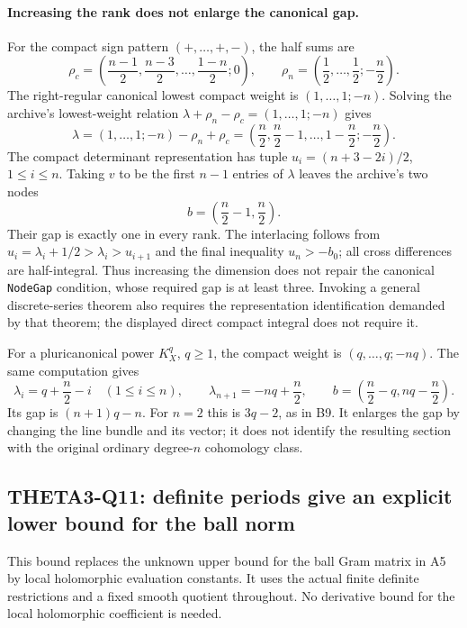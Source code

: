 \documentclass[11pt]{article}
\theoremstyle{definition}\newtheorem{definition}[theorem]{Definition}\newtheorem{remark}[theorem]{Remark}
\begin{document}
\paragraph{Increasing the rank does not enlarge the canonical gap.}
For the compact sign pattern $(+,\ldots,+,-)$, the half sums are
\[
 \rho_c=\left(\frac{n-1}{2},\frac{n-3}{2},\ldots,
                         \frac{1-n}{2};0\right),\qquad
 \rho_n=\left(\frac12,\ldots,\frac12;-\frac n2\right).
\]
The right-regular canonical lowest compact weight is
$(1,\ldots,1;-n)$. Solving the archive's lowest-weight relation
$\lambda+\rho_n-\rho_c=(1,\ldots,1;-n)$ gives
\[
 \lambda=(1,\ldots,1;-n)-\rho_n+\rho_c
       =\left(\frac n2,\frac n2-1,\ldots,
                          1-\frac n2;-\frac n2\right).
\]
The compact determinant representation has tuple
$u_i=(n+3-2i)/2$, $1\leq i\leq n$.
Taking $v$ to be the first $n-1$ entries of $\lambda$ leaves
the archive's two nodes
\[
 b=\left(\frac n2-1,\frac n2\right).
\]
Their gap is exactly one in every rank.
The interlacing follows from
$u_i=\lambda_i+1/2>\lambda_i>u_{i+1}$ and the final inequality
$u_n>-\!b_0$; all cross differences are half-integral.
Thus increasing the dimension does not repair the canonical
\texttt{NodeGap} condition, whose required gap is at least
three. Invoking a general discrete-series theorem also requires
the representation identification demanded by that theorem;
the displayed direct compact integral does not require it.

For a pluricanonical power $K_X^q$, $q\geq1$, the compact weight
is $(q,\ldots,q;-nq)$. The same computation gives
\[
 \lambda_i=q+\frac n2-i\quad(1\leq i\leq n),\qquad
 \lambda_{n+1}=-nq+\frac n2,
 \qquad
 b=\left(\frac n2-q,nq-\frac n2\right).
\]
Its gap is $(n+1)q-n$. For $n=2$ this is $3q-2$, as in B9.
It enlarges the gap by changing the line bundle and its vector;
it does not identify the resulting section with the original
ordinary degree-$n$ cohomology class.



\subsection{THETA3-Q11: definite periods give an explicit lower bound for the ball norm}\label{Q11}

This bound replaces the unknown upper bound for the ball Gram
matrix in A5 by local holomorphic evaluation constants.  It uses
the actual finite definite restrictions and a fixed smooth
quotient throughout.  No derivative bound for the local
holomorphic coefficient is needed.
\end{document}
